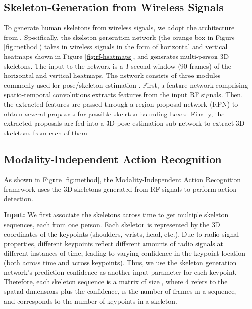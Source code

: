 \documentclass[10pt,twocolumn,letterpaper]{article}
\begin{document}
\subsection{Skeleton-Generation from Wireless Signals}
To generate human skeletons from wireless signals, we adopt the architecture from \cite{zhao2018rf}. Specifically, the skeleton generation network (the orange box in Figure \ref{fig:method}) takes in wireless signals in the form of horizontal and vertical heatmaps shown in Figure \ref{fig:rf-heatmaps}, and generates multi-person 3D skeletons. The input to the network is a 3-second window (90 frames) of the horizontal and vertical heatmaps. The network consists of three modules commonly used for pose/skeleton estimation \cite{zhao2018rf}. First, a feature network comprising spatio-temporal convolutions extracts features from the input RF signals. Then, the extracted features are passed through a region proposal network (RPN) to obtain several proposals for possible skeleton bounding boxes. Finally, the extracted proposals are fed into a 3D pose estimation sub-network to extract 3D skeletons from each of them.  





\subsection{Modality-Independent Action Recognition}
As shown in Figure \ref{fig:method}, the Modality-Independent Action Recognition framework uses the 3D skeletons generated from RF signals to perform action detection.

\noindent\textbf{Input: }We first associate the skeletons across time to get multiple skeleton sequences, each from one person. Each skeleton is represented by the 3D coordinates of the keypoints (shoulders, wrists, head, etc.). Due to radio signal properties, different keypoints reflect different amounts of radio signals at different instances of time, leading to varying confidence in the keypoint location (both across time and across keypoints). Thus, we use the skeleton generation network's prediction confidence as another input parameter for each keypoint. Therefore, each skeleton sequence is a matrix of size ,  where 4 refers to the spatial dimensions plus the confidence,  is the number of frames in a sequence, and  corresponds to the number of keypoints in a skeleton.
\end{document}
